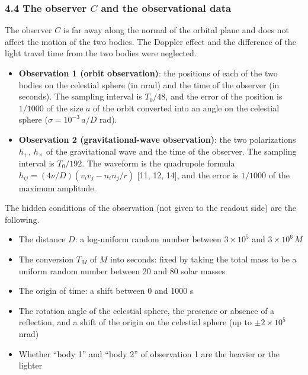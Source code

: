 \documentclass[
  a4paper,
]{article}
\providecommand{\tightlist}{%
  \setlength{\itemsep}{0pt}\setlength{\parskip}{0pt}}
\begin{document}
\subsubsection{\texorpdfstring{4.4 The observer \(C\) and the
observational
data}{4.4 The observer C and the observational data}}\label{the-observer-c-and-the-observational-data}

The observer \(C\) is far away along the normal of the orbital plane and
does not affect the motion of the two bodies. The Doppler effect and the
difference of the light travel time from the two bodies were neglected.

\begin{itemize}
\tightlist
\item
  \textbf{Observation 1 (orbit observation)}: the positions of each of
  the two bodies on the celestial sphere (in nrad) and the time of the
  observer (in seconds). The sampling interval is \(T_0/48\), and the
  error of the position is \(1/1000\) of the size \(a\) of the orbit
  converted into an angle on the celestial sphere
  (\(\sigma=10^{-3}\,a/D\) rad).
\item
  \textbf{Observation 2 (gravitational-wave observation)}: the two
  polarizations \(h_+\), \(h_\times\) of the gravitational wave and the
  time of the observer. The sampling interval is \(T_0/192\). The
  waveform is the quadrupole formula
  \(h_{ij}=(4\nu/D)(v_iv_j-n_in_j/r)\) {[}11, 12, 14{]}, and the error
  is \(1/1000\) of the maximum amplitude.
\end{itemize}

The hidden conditions of the observation (not given to the readout side)
are the following.

\begin{itemize}
\tightlist
\item
  The distance \(D\): a log-uniform random number between
  \(3\times10^5\) and \(3\times10^6\,M\)
\item
  The conversion \(T_M\) of \(M\) into seconds: fixed by taking the
  total mass to be a uniform random number between 20 and 80 solar
  masses
\item
  The origin of time: a shift between 0 and 1000 s
\item
  The rotation angle of the celestial sphere, the presence or absence of
  a reflection, and a shift of the origin on the celestial sphere (up to
  \(\pm2\times10^5\) nrad)
\item
  Whether ``body 1'' and ``body 2'' of observation 1 are the heavier or
  the lighter
\end{itemize}
\end{document}
